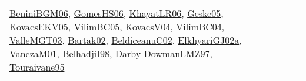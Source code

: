{\begin{longtable}{lp{3cm}>{\raggedright}p{6cm}>{\raggedright}p{6cm}p{8cm}}
\href{papers/BeniniBGM06.pdf}{BeniniBGM06}\cite{BeniniBGM06}, \href{papers/GomesHS06.pdf}{GomesHS06}\cite{GomesHS06}, \href{articles/KhayatLR06.pdf}{KhayatLR06}\cite{KhayatLR06}, \href{papers/Geske05.pdf}{Geske05}\cite{Geske05}, \href{papers/KovacsEKV05.pdf}{KovacsEKV05}\cite{KovacsEKV05}, \href{articles/VilimBC05.pdf}{VilimBC05}\cite{VilimBC05}, \href{papers/KovacsV04.pdf}{KovacsV04}\cite{KovacsV04}, \href{papers/VilimBC04.pdf}{VilimBC04}\cite{VilimBC04}, \href{papers/ValleMGT03.pdf}{ValleMGT03}\cite{ValleMGT03}, \href{papers/Bartak02.pdf}{Bartak02}\cite{Bartak02}, \href{papers/BeldiceanuC02.pdf}{BeldiceanuC02}\cite{BeldiceanuC02}, \href{papers/ElkhyariGJ02a.pdf}{ElkhyariGJ02a}\cite{ElkhyariGJ02a}, \href{papers/VanczaM01.pdf}{VanczaM01}\cite{VanczaM01}, \href{articles/BelhadjiI98.pdf}{BelhadjiI98}\cite{BelhadjiI98}, \href{articles/Darby-DowmanLMZ97.pdf}{Darby-DowmanLMZ97}\cite{Darby-DowmanLMZ97}, \href{papers/Touraivane95.pdf}{Touraivane95}\cite{Touraivane95}\\

\end{longtable}}
